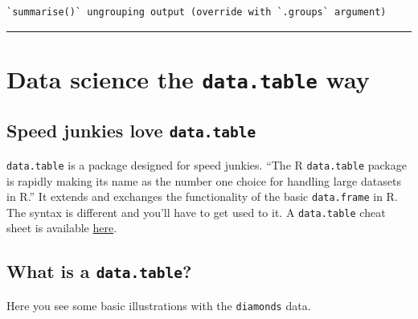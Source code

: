 \documentclass[
]{book}
\newenvironment{Shaded}{\begin{snugshade}}{\end{snugshade}}
\newcommand{\DataTypeTok}[1]{\textcolor[rgb]{0.13,0.29,0.53}{#1}}
\newcommand{\KeywordTok}[1]{\textcolor[rgb]{0.13,0.29,0.53}{\textbf{#1}}}
\newcommand{\NormalTok}[1]{#1}
\newcommand{\OperatorTok}[1]{\textcolor[rgb]{0.81,0.36,0.00}{\textbf{#1}}}
\newcommand{\StringTok}[1]{\textcolor[rgb]{0.31,0.60,0.02}{#1}}
\begin{document}
\begin{verbatim}
`summarise()` ungrouping output (override with `.groups` argument)
\end{verbatim}

\begin{Shaded}
\end{Shaded}

\begin{center}\rule{0.5\linewidth}{0.5pt}\end{center}

\hypertarget{data-science-the-data.table-way}{%
\section{\texorpdfstring{Data science the \texttt{data.table} way}{Data science the data.table way}}\label{data-science-the-data.table-way}}

\hypertarget{speed-junkies-love-data.table}{%
\subsection{\texorpdfstring{Speed junkies love \texttt{data.table}}{Speed junkies love data.table}}\label{speed-junkies-love-data.table}}

\texttt{data.table} is a package designed for speed junkies. ``The R \texttt{data.table} package is rapidly making its name as the number one choice for handling large datasets in R.'' It extends and exchanges the functionality of the basic \texttt{data.frame} in R. The syntax is different and you'll have to get used to it. A \texttt{data.table} cheat sheet is available \href{https://s3.amazonaws.com/assets.datacamp.com/img/blog/data+table+cheat+sheet.pdf}{here}.

\hypertarget{what-is-a-data.table}{%
\subsection{\texorpdfstring{What is a \texttt{data.table}?}{What is a data.table?}}\label{what-is-a-data.table}}

Here you see some basic illustrations with the \texttt{diamonds} data.
\end{document}
